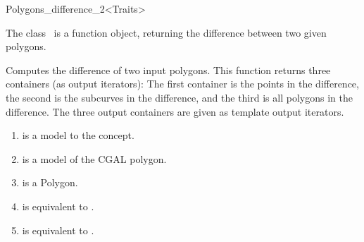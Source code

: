 
\ccRefPageBegin



\begin{ccRefFunctionObjectClass}{Polygons_difference_2<Traits>}
\label{OVL_sec:polygon_difference}
    
\ccDefinition
The class \ccClassTemplateName\ is a function object,
returning the difference between two given polygons.


  
{Computes the difference of two input polygons.
This function returns three containers (as output iterators):
The first container is the points in the difference, 
the second is the subcurves in the difference,
and the third is all polygons in the difference.
The three output containers are given as template
output iterators.
}

\begin{enumerate}
   \item
    is a model to the  concept.
   \item
    is a model of the CGAL polygon.
   \item
    is a Polygon.
   \item    
    is equivalent to .
   \item
    is equivalent to .
\end{enumerate}


\end{ccRefFunctionObjectClass}
